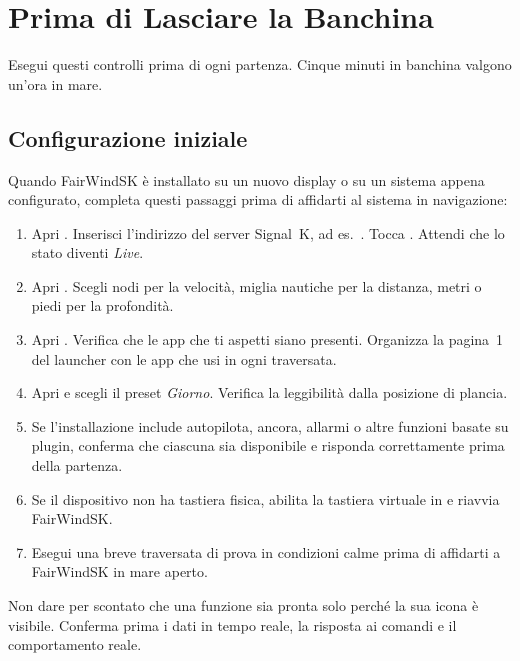 \chapter{Prima di Lasciare la Banchina}

Esegui questi controlli prima di ogni partenza.
Cinque minuti in banchina valgono un'ora in mare.

\section{Configurazione iniziale}

Quando FairWindSK è installato su un nuovo display o su un sistema appena configurato,
completa questi passaggi prima di affidarti al sistema in navigazione:

\begin{enumerate}
  \item Apri .
        Inserisci l'indirizzo del server Signal~K, ad es.\ .
        Tocca .
        Attendi che lo stato diventi \textit{Live}.
  \item Apri .
        Scegli nodi per la velocità, miglia nautiche per la distanza, metri o piedi per la profondità.
  \item Apri .
        Verifica che le app che ti aspetti siano presenti.
        Organizza la pagina~1 del launcher con le app che usi in ogni traversata.
  \item Apri  e scegli il preset \textit{Giorno}.
        Verifica la leggibilità dalla posizione di plancia.
  \item Se l'installazione include autopilota, ancora, allarmi o altre funzioni
        basate su plugin, conferma che ciascuna sia disponibile e risponda correttamente
        prima della partenza.
  \item Se il dispositivo non ha tastiera fisica, abilita la tastiera virtuale in
         e riavvia FairWindSK.
  \item Esegui una breve traversata di prova in condizioni calme prima di affidarti
        a FairWindSK in mare aperto.
\end{enumerate}

\begin{warningbox}
Non dare per scontato che una funzione sia pronta solo perché la sua icona è visibile.
Conferma prima i dati in tempo reale, la risposta ai comandi e il comportamento reale.
\end{warningbox}

